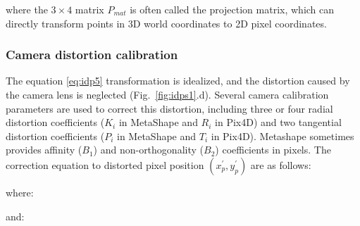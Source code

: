 \noindent
where the $3\times4$ matrix $P_{mat}$ is often called the projection matrix, which can directly transform points in 3D world coordinates to 2D pixel coordinates.

\subsubsection*{Camera distortion calibration}

The equation \eqref{eq:idp5} transformation is idealized, and the distortion caused by the camera lens is neglected (Fig.~\ref{fig:idps1}.d). Several camera calibration parameters are used to correct this distortion, including three or four radial distortion coefficients ($K_i$ in MetaShape and $R_i$ in Pix4D) and two tangential distortion coefficients ($P_i$ in MetaShape and $T_i$ in Pix4D). Metashape sometimes provides affinity ($B_1$) and non-orthogonality ($B_2$) coefficients in pixels. The correction equation to distorted pixel position $(x_p^\prime,y_p^\prime)$ are as follows:



\noindent
where:



\noindent
and: 

